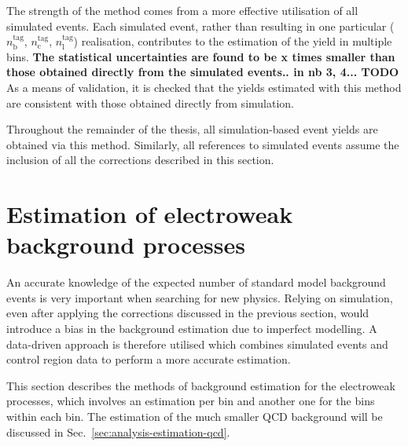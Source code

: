 The strength of the method comes from a more effective utilisation of all 
simulated events.
Each simulated event, rather than resulting in one particular ($n_\mathrm 
b^\mathrm{tag}$, $n_\mathrm c^\mathrm{tag}$, $n_\mathrm l^\mathrm{tag}$) 
realisation, contributes to the estimation of the yield in multiple \nb bins.
\textbf{The statistical uncertainties are found to be x times smaller than 
those 
obtained directly from the simulated events.. in nb 3, 4... TODO}
As a means of validation, it is checked that the yields estimated with this 
method are consistent with those obtained directly from simulation.


Throughout the remainder of the thesis, all simulation-based event yields are 
obtained via this method. Similarly, all references to simulated events assume 
the inclusion of all the corrections described in this section. 

\section{Estimation of electroweak background processes}
\label{sec:analysis-estimation-ewk}
An accurate knowledge of the expected number of standard model background 
events is very important when searching for new physics. Relying on simulation, 
even after applying the corrections discussed in the previous section, would 
introduce a bias in the background estimation due to imperfect modelling. A 
data-driven approach is therefore utilised which combines simulated events and 
control region data to perform a more accurate estimation.

This section describes the methods of background estimation for the electroweak 
processes, which involves an estimation per \njnbht bin and another one for the 
\mht bins within each \njnbht bin. The estimation of the much smaller QCD 
background will be discussed in Sec.~\ref{sec:analysis-estimation-qcd}.


